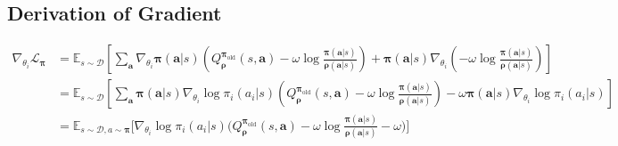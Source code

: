 \documentclass{article}
\begin{document}
	
	\subsection{Derivation of Gradient}
	\label{sec:app-grad}
	\[ 
	\begin{split} 
		\nabla_{\theta_i}\mathcal{L}_{\bm{\pi}} & = \mathbb{E}_{s \sim \mathcal{D}}\left[ \sum_{\bm{a}} \nabla_{\theta_i}{\bm{\pi}}(\bm{a}|s) \left(  Q^{{\bm{\pi}_{\operatorname{old}}}}_{\bm{\rho}}(s,\bm{a}) - \omega \log \frac{{\bm{\pi}}(\bm{a}|s)}{{\bm{\rho}}(\bm{a}|s)}  \right) + {\bm{\pi}}(\bm{a}|s)\nabla_{\theta_i}(- \omega \log \frac{{\bm{\pi}}(\bm{a}|s)}{{\bm{\rho}}(\bm{a}|s)}) \right] \\
		& = \mathbb{E}_{s \sim \mathcal{D}}\left[ \sum_{\bm{a}} {\bm{\pi}}(\bm{a}|s) \nabla_{\theta_i} \log \pi_i(a_i | s) \left(  Q^{{\bm{\pi}_{\operatorname{old}}}}_{\bm{\rho}}(s,\bm{a}) - \omega \log \frac{{\bm{\pi}}(\bm{a}|s)}{{\bm{\rho}}(\bm{a}|s)}  \right) - \omega {\bm{\pi}}(\bm{a}|s)\nabla_{\theta_i} \log \pi_i(a_i | s)  \right] \\
		& =\mathbb{E}_{s \sim \mathcal{D}, a \sim \bm{\pi}}\bigg[  \nabla_{\theta_i} \log\pi_i(a_i|s)  \bigg( Q^{{\bm{\pi}_{\operatorname{old}}}}_{\bm{\rho}}(s,\bm{a}) 
		- \omega \log \frac{{\bm{\pi}}(\bm{a}|s)}{{\bm{\rho}}(\bm{a}|s)} - \omega  \bigg) \bigg] \\
	\end{split} 
	\]
\end{document}
